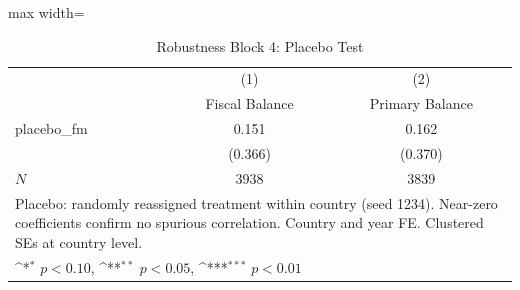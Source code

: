 \begin{table}[htbp]\centering
\def\sym#1{\ifmmode^{#1}\else\(^{#1}\)\fi}
\caption{Robustness Block 4: Placebo Test}
\begin{adjustbox}{max width=\textwidth}
\small
\begin{tabular}{l*{2}{c}}
\hline\hline
            &\multicolumn{1}{c}{(1)}&\multicolumn{1}{c}{(2)}\\
            &\multicolumn{1}{c}{Fiscal Balance}&\multicolumn{1}{c}{Primary Balance}\\
\hline
placebo\_fm  &       0.151         &       0.162         \\
            &     (0.366)         &     (0.370)         \\
\hline
\(N\)       &        3938         &        3839         \\
\hline\hline
\multicolumn{3}{l}{\footnotesize Placebo: randomly reassigned treatment within country (seed 1234).  Near-zero coefficients confirm no spurious correlation.  Country and year FE. Clustered SEs at country level.}\\
\multicolumn{3}{l}{\footnotesize \sym{*} \(p<0.10\), \sym{**} \(p<0.05\), \sym{***} \(p<0.01\)}\\
\end{tabular}
\end{adjustbox}
\end{table}
